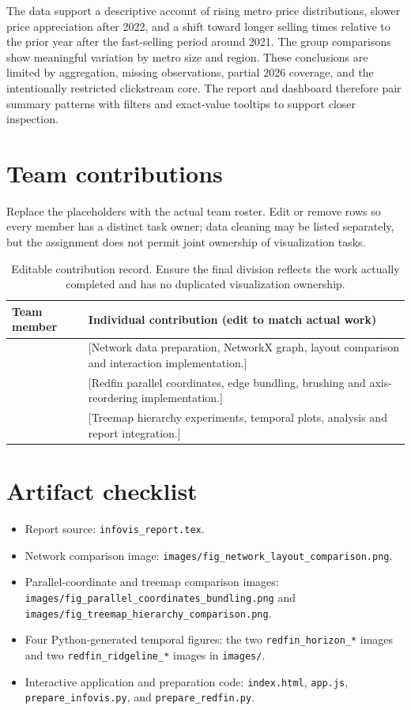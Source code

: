 \documentclass[11pt,letterpaper]{article}
\newcommand{\memberA}{[Member 1 name, student ID]}
\newcommand{\memberB}{[Member 2 name, student ID]}
\newcommand{\memberC}{[Member 3 name, student ID]}
\begin{document}
The data support a descriptive account of rising metro price distributions, slower price appreciation after 2022, and a shift toward longer selling times relative to the prior year after the fast-selling period around 2021. The group comparisons show meaningful variation by metro size and region. These conclusions are limited by aggregation, missing observations, partial 2026 coverage, and the intentionally restricted clickstream core. The report and dashboard therefore pair summary patterns with filters and exact-value tooltips to support closer inspection.

\section{Team contributions}\label{sec:contrib}
Replace the placeholders with the actual team roster. Edit or remove rows so every member has a distinct task owner; data cleaning may be listed separately, but the assignment does not permit joint ownership of visualization tasks.

\begin{table}[H]
\centering
\begin{tabularx}{\textwidth}{p{}Y}
\toprule
\textbf{Team member} & \textbf{Individual contribution (edit to match actual work)} \\
\midrule
\memberA & [Network data preparation, NetworkX graph, layout comparison and interaction implementation.] \\
\memberB & [Redfin parallel coordinates, edge bundling, brushing and axis-reordering implementation.] \\
\memberC & [Treemap hierarchy experiments, temporal plots, analysis and report integration.] \\
\bottomrule
\end{tabularx}
\caption{Editable contribution record. Ensure the final division reflects the work actually completed and has no duplicated visualization ownership.}
\label{tab:contrib}
\end{table}

\section*{Artifact checklist}
\begin{itemize}[leftmargin=*]
  \item Report source: \texttt{infovis\_report.tex}.
  \item Network comparison image: \texttt{images/fig\_network\_layout\_comparison.png}.
  \item Parallel-coordinate and treemap comparison images: \texttt{images/fig\_parallel\_coordinates\_bundling.png} and \texttt{images/fig\_treemap\_hierarchy\_comparison.png}.
  \item Four Python-generated temporal figures: the two \texttt{redfin\_horizon\_*} images and two \texttt{redfin\_ridgeline\_*} images in \texttt{images/}.
  \item Interactive application and preparation code: \texttt{index.html}, \texttt{app.js}, \texttt{prepare\_infovis.py}, and \texttt{prepare\_redfin.py}.
\end{itemize}
\end{document}
